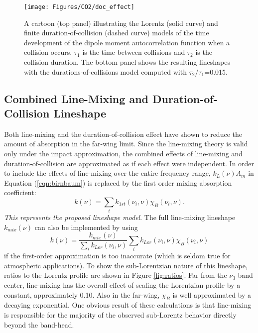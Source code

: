 \documentclass[11pt]{article}
\begin{document}
\begin{figure}
\begin{center}\texttt{[image: Figures/CO2/doc\_effect]}
\end{center}
  \caption[Illustration of the Lorentz and
        finite duration-of-collision models of the time
        development of the dipole moment autocorrelation function
        and the resulting lineshapes.] 
        {A cartoon (top panel) illustrating the Lorentz (solid curve) and
        finite duration-of-collision (dashed curve) models of the time
        development of the dipole moment autocorrelation function when a 
        collision occurs.  $\tau_1$ is the time between collisions and
        $\tau_2$ is the collision duration.  The bottom panel shows the 
        resulting lineshapes with the durations-of-collisions model 
        computed with $\tau_2$/$\tau_1$=0.015.}
  \label{fig:doc_effect}
\end{figure}

\subsection{Combined Line-Mixing and Duration-of-Collision Lineshape}
\label{sec:combined}
Both line-mixing and the duration-of-collision effect have shown to reduce
the amount of absorption in the far-wing limit.  Since the line-mixing
theory is valid only under the impact approximation, the combined effects
of line-mixing and duration-of-collision are approximated as if each
effect were independent.  In order to include the effects of line-mixing
over the entire frequency range, $k_{L}(\nu) A_{m}$ in 
Equation (\ref{eqn:birnbaum}) is replaced by the first order mixing 
absorption coefficient:
\begin{equation}
k(\nu)=\sum_i k_{1st}(\nu_i,\nu)\chi_{B}(\nu_i,\nu).
\label{eqn:proposed}
\end{equation}
{\em This represents the proposed lineshape model}.  The full line-mixing 
lineshape $k_{mix}(\nu)$ can also be implemented by using 
\[
k(\nu)=\frac{k_{mix}(\nu)}{\sum_i k_{Lor}(\nu_i,\nu)}
\sum_i k_{Lor}(\nu_i,\nu)\chi_B(\nu_i,\nu)
\]
if the first-order approximation is too inaccurate (which is seldom true 
for atmospheric applications).
To show the sub-Lorentzian nature of this lineshape, ratios to the Lorentz 
profile are shown in Figure \ref{fig:ratios}.  Far from the $\nu_3$ band 
center, line-mixing has the overall effect of scaling the Lorentzian 
profile by a constant, approximately 0.10.  Also in the far-wing, $\chi_B$
is well approximated by a decaying exponential.  One obvious result of
these calculations is that line-mixing is responsible for the majority of
the observed sub-Lorentz behavior directly beyond the band-head.
\end{document}
